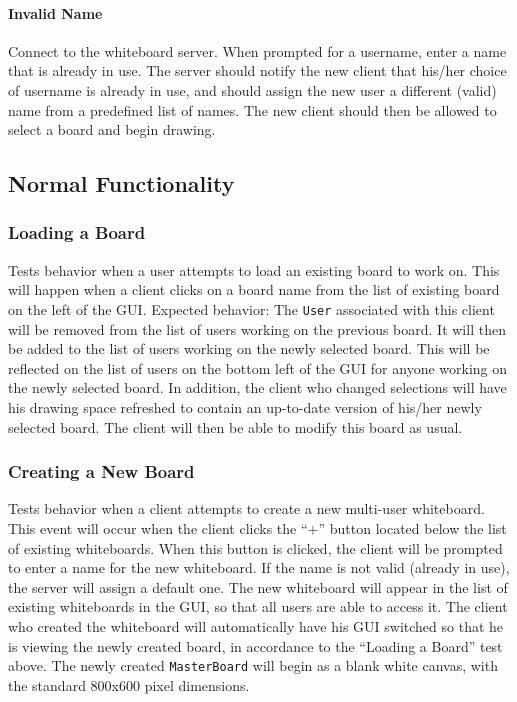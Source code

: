 \paragraph{Invalid Name}
Connect to the whiteboard server. When prompted for a username, enter a name that is already in use. The server should notify the new client that his/her choice of username is already in use, and should assign the new user a different (valid) name from a predefined list of names.  The new client should then be allowed to select a board and begin drawing.

\subsection{Normal Functionality}

\subsubsection{Loading a Board}
Tests behavior when a user attempts to load an existing board to work on.  This will happen when a client clicks on a board name from the list of existing board on the left of the GUI.  Expected behavior: The \texttt{User} associated with this client will be removed from the list of users working on the previous board.  It will then be added to the list of users working on the newly selected board.  This will be reflected on the list of users on the bottom left of the GUI for anyone working on the newly selected board.  In addition, the client who changed selections will have his drawing space refreshed to contain an up-to-date version of his/her newly selected board.  The client will then be able to modify this board as usual.

\subsubsection{Creating a New Board}
Tests behavior when a client attempts to create a new multi-user whiteboard.  This event will occur when the client clicks the “+” button located below the list of existing whiteboards.  When this button is clicked, the client will be prompted to enter a name for the new whiteboard. If the name is not valid (already in use), the server will assign a default one.  The new whiteboard will appear in the list of existing whiteboards in the GUI, so that all users are able to access it.  The client who created the whiteboard will automatically have his GUI switched so that he is viewing the newly created board, in accordance to the “Loading a Board” test above. The newly created \texttt{MasterBoard} will begin as a blank white canvas, with the standard 800x600 pixel dimensions.

